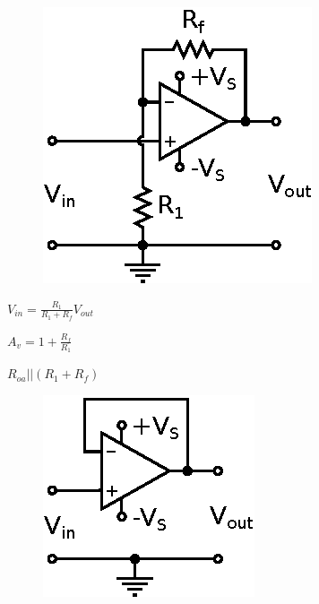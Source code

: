 \documentclass[11pt]{article}
\def\lthtmlcheckvsize{\ifdim\ht\sizebox<\vsize 
  \ifdim\wd\sizebox<\hsize\expandafter\hfill\fi \expandafter\vfill
  \else\expandafter\vss\fi}%
\begin{document}
{\newpage\clearpage
{}%
\begin{figure}  
  \begin{center}
    \includegraphics{noninvertingamp.eps}
    
  \end{center}
\end{figure}%
\lthtmlfigureZ
\lthtmlcheckvsize\clearpage}

{\newpage\clearpage
{}%
$\displaystyle V_{in} = \frac{R_1}{R_1 + R_f} V_{out}
$%
\lthtmlindisplaymathZ
\lthtmlcheckvsize\clearpage}

{\newpage\clearpage
{}%
$\displaystyle A_v = 1 + \frac{R_f}{R_1}
$%
\lthtmlindisplaymathZ
\lthtmlcheckvsize\clearpage}

{\newpage\clearpage
{}%
$R_{oa}||(R_1 + R_f)$%
\lthtmlindisplaymathZ
\lthtmlcheckvsize\clearpage}

{\newpage\clearpage
{}%
\begin{figure}  
  \begin{center}
    \includegraphics{vfollower.eps}
    
  \end{center}
\end{figure}%
\lthtmlfigureZ
\lthtmlcheckvsize\clearpage}
\end{document}
